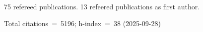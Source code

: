 75 refereed publications. 13 refeered publications as first author.

Total citations~=~5196; h-index~=~38 (2025-09-28)